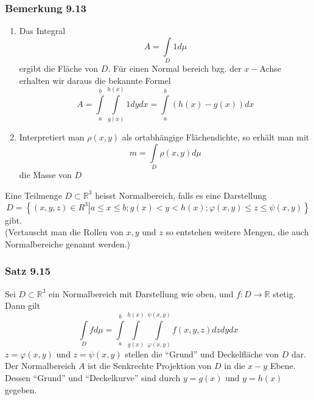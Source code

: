 \subsubsection*{Bemerkung 9.13}
\begin{enumerate}
\item Das Integral \[A = \int\limits_D {1d\mu } \] ergibt die Fläche von $D$. Für einen Normal bereich bzg. der $x-$Achse erhalten wir daraus die bekannte Formel
\[A = \int\limits_a^b {\int\limits_{g(x)}^{h(x)} {1dydx} }  = \int\limits_a^b {\left( {h(x) - g(x)} \right)dx} \]
\item Interpretiert man $\rho(x,y)$ als ortabhängige Flächendichte, so erhält man mit \[m = \int\limits_D {\rho \left( {x,y} \right)d\mu } \] die Masse von $D$
\end{enumerate}

\begin{definition}{9.14}
Eine Teilmenge $D\subset\mathbb{R}^3$ heisst Normalbereich, falls es eine Darstellung 
\[D = \left\{ {\left. {\left( {x,y,z} \right) \in {R^3}} \right|a \le x \le b;g(x) < y < h(x);\varphi \left( {x,y} \right) \le z \le \psi \left( {x,y} \right)} \right\}\] gibt.\\

(Vertauscht man die Rollen von $x,y$ und $z$ so entstehen weitere Mengen, die auch Normalbereiche genannt werden.)
\end{definition}

\subsubsection*{Satz 9.15}
Sei $D\subset\mathbb{R}^3$ ein Normalbereich mit Darstellung wie oben, und $f:D\to\mathbb{R}$ stetig. Dann gilt \[\int\limits_D {fd\mu }  = \int\limits_a^b {\int\limits_{g(x)}^{h(x)} {\int\limits_{\varphi \left( {x,y} \right)}^{\psi \left( {x,y} \right)} {f\left( {x,y,z} \right)dzdydx} } } \]
$z=\varphi \left( {x,y} \right)$ und $z=\psi \left( {x,y} \right)$ stellen die ``Grund'' und Deckelfläche von $D$ dar. \\

Der Normalbereich $A$ ist die Senkrechte Projektion von $D$ in die $x-y$ Ebene. Dessen ``Grund'' und ``Deckelkurve'' sind durch $y=g(x)$ und $y=h(x)$ gegeben.

